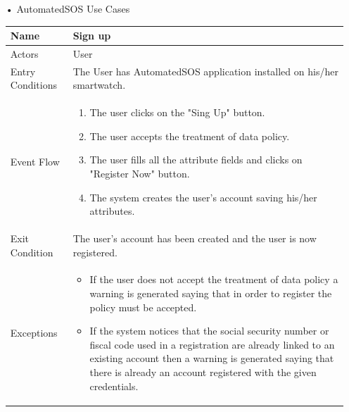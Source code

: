 \begin{enumerate}
\item[•]{\Large AutomatedSOS Use Cases}
\FloatBarrier
\begin{table}[h]
\begin{tabular}{|l|p{}|}
\hline
Name             & Sign up \\ \hline
Actors           & User  \\ \hline
Entry Conditions & The User has AutomatedSOS application installed on his/her smartwatch.    \\ \hline
Event Flow       & \begin{enumerate}
            \item The user clicks on the "Sing Up" button.
            \item The user accepts the treatment of data policy.
            \item The user fills all the attribute fields and clicks on "Register Now" button.
            \item The system creates the user's account saving his/her attributes.
        \end{enumerate}\\ \hline
Exit Condition   & The user's account has been created and the user is now registered.\\ \hline
Exceptions       & \begin{itemize}
\item If the user does not accept the treatment of data policy a warning is generated saying that in order to register the policy must be accepted.
\item If the system notices that the social security number or fiscal code used in a registration are already linked to an existing account then a warning is generated saying that there is already an account registered with the given credentials.
\end{itemize}\\ \hline
\end{tabular}
\end{table}
\FloatBarrier


\end{enumerate}
